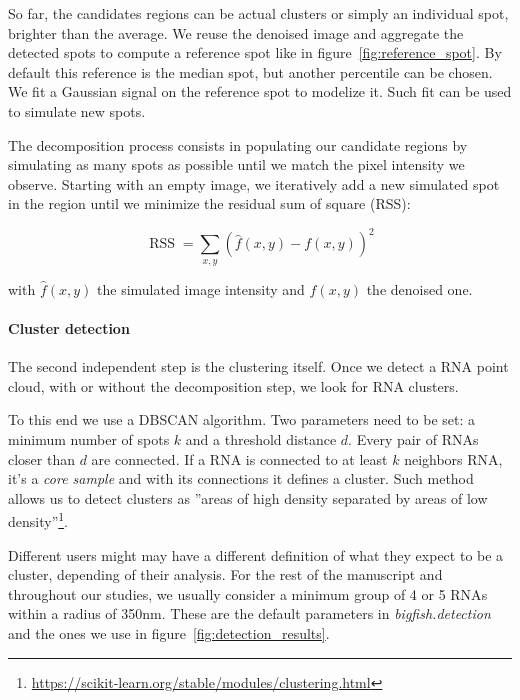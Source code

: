 So far, the candidates regions can be actual clusters or simply an individual spot, brighter than the average.
We reuse the denoised image and aggregate the detected spots to compute a reference spot like in figure~\ref{fig:reference_spot}.
By default this reference is the median spot, but another percentile can be chosen.
We fit a Gaussian signal on the reference spot to modelize it.
Such fit can be used to simulate new spots.

The decomposition process consists in populating our candidate regions by simulating as many spots as possible until we match the pixel intensity we observe.
Starting with an empty image, we iteratively add a new simulated spot in the region until we minimize the residual sum of square (RSS):

\begin{equation}
	{\displaystyle \operatorname{RSS} = \sum _{x, y}(\hat{f}(x, y) - f(x, y))^{2}}
\end{equation}

\noindent
with $\hat{f}(x, y)$ the simulated image intensity and $f(x, y)$ the denoised one.

\paragraph{Cluster detection}

The second independent step is the clustering itself.
Once we detect a \ac{RNA} point cloud, with or without the decomposition step, we look for \ac{RNA} clusters.

To this end we use a DBSCAN algorithm\cite{ester_density-based_1996, scikit-learn}.
Two parameters need to be set: a minimum number of spots $k$ and a threshold distance $d$.
Every pair of \ac{RNA}s closer than $d$ are connected.
If a \ac{RNA} is connected to at least $k$ neighbors \ac{RNA}, it's a \emph{core sample} and with its connections it defines a cluster.
Such method allows us to detect clusters as ''areas of high density separated by areas of low density''\footnote{\url{https://scikit-learn.org/stable/modules/clustering.html}}.

Different users might may have a different definition of what they expect to be a cluster, depending of their analysis.
For the rest of the manuscript and throughout our studies, we usually consider a minimum group of 4 or 5 \ac{RNA}s within a radius of 350nm.
These are the default parameters in \emph{bigfish.detection} and the ones we use in figure~\ref{fig:detection_results}.\\

